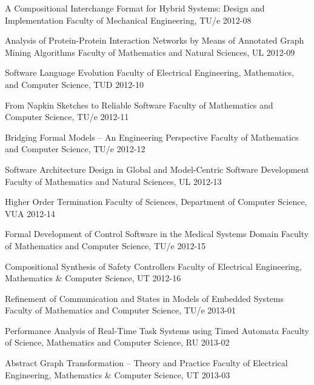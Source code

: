 \begin{multicols}{2}
         {A Compositional Interchange Format for Hybrid Systems: Design and
Implementation}
         {Faculty of Mechanical Engineering, TU/e}
         {2012-08}

         {Analysis of Protein-Protein Interaction Networks by Means of Annotated Graph Mining Algorithms}
         {Faculty of Mathematics and Natural Sciences, UL}
         {2012-09}

         {Software Language Evolution}
         {Faculty of Electrical Engineering, Mathematics, and Computer Science, TUD}
         {2012-10}

         {From Napkin Sketches to Reliable Software}
         {Faculty of Mathematics and Computer Science, TU/e}
         {2012-11}

         {Bridging Formal Models -- An Engineering Perspective}
         {Faculty of Mathematics and Computer Science, TU/e}
         {2012-12}

         {Software Architecture Design in Global and Model-Centric Software Development}
         {Faculty of Mathematics and Natural Sciences, UL}
         {2012-13}

         {Higher Order Termination}
         {Faculty of Sciences, Department of Computer Science, VUA}
         {2012-14}

         {Formal Development of Control Software in the Medical
Systems Domain}
         {Faculty of Mathematics and Computer Science, TU/e}
         {2012-15}

         {Compositional Synthesis of Safety Controllers}
         {Faculty of Electrical Engineering, Mathematics \& Computer Science, UT}
         {2012-16}

         {Refinement of Communication and States in Models of Embedded Systems}
         {Faculty of Mathematics and Computer Science, TU/e}
         {2013-01}

         {Performance Analysis of Real-Time Task Systems using Timed Automata}
         {Faculty of Science, Mathematics and Computer Science, RU}
         {2013-02}

         {Abstract Graph Transformation -- Theory and Practice}
         {Faculty of Electrical Engineering, Mathematics \& Computer Science, UT}
         {2013-03}


\end{multicols}
